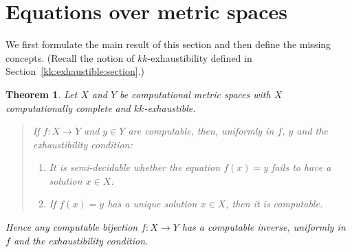 \documentclass[10pt]{article}
\newtheorem{Alg}[cor]{Algorithm}
\newtheorem{theorem}[cor]{Theorem}
\newenvironment{algorithm}{\begin{Alg}\em}{\end{Alg}}
\newcommand{\N}{\mathbb{N}}
\begin{document}

\section{Equations over metric spaces} \label{metric:spaces}

We first formulate the main result of this section and then define
the missing concepts. (Recall the notion of $kk$-exhaustibility
defined in Section~\ref{kk:exhaustible:section}.)
\begin{theorem} \label{unique:solution:metric} Let $X$ and $Y$ be
  computational metric spaces with $X$ computationally complete and
  $kk$-exhaustible.
\begin{quote}
  If $f\colon X \to Y$ and $y \in Y$ are computable, then, uniformly
  in $f$, $y$ and the exhaustibility condition:
\begin{enumerate}
\item \label{unique:solution:metric2} It is semi-decidable whether the
  equation $f(x) = y$ fails to have a solution $x \in X$.
\item \label{unique:solution:metric:1} If $f(x) = y$ has a unique solution
  $x \in X$, then it is computable.
\end{enumerate}
\end{quote}
Hence any computable bijection $f\colon X \to
  Y$ has a computable inverse, uniformly in $f$ and the exhaustibility
  condition.
\end{theorem}
\end{document}
